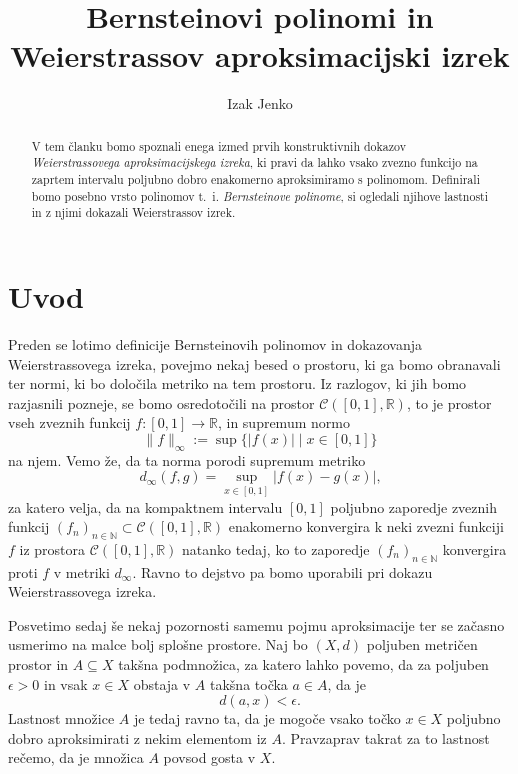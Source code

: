 \documentclass[a4paper, reqno]{amsart}
\theoremstyle{theorem}
\theoremstyle{definition}
\begin{document}
\title{Bernsteinovi polinomi in Weierstrassov aproksimacijski izrek}
\author{Izak Jenko}

\maketitle
\thispagestyle{empty}

\begin{abstract}
	V tem članku bomo spoznali enega izmed prvih konstruktivnih dokazov 
	\emph{Weierstrassovega aproksimacijskega izreka}, ki pravi da lahko vsako zvezno 
	funkcijo na zaprtem intervalu poljubno dobro enakomerno aproksimiramo s polinomom. 
	Definirali bomo posebno vrsto polinomov t.~i. \emph{Bernsteinove polinome}, si ogledali
	njihove lastnosti in z njimi dokazali Weierstrassov izrek.
\end{abstract}

\newcommand{\RR}{\mathbb{R}}
\newcommand{\NN}{\mathbb{N}}
\newcommand{\CIR}{\mathcal{C}([0,1],\RR)}
\newcommand{\dinf}{d_{\infty}}

\section{Uvod}

\par
Preden se lotimo definicije Bernsteinovih polinomov in dokazovanja Weierstrassovega
izreka, povejmo nekaj besed o prostoru, ki ga bomo obranavali ter normi, ki bo
določila metriko na tem prostoru. Iz razlogov, ki jih bomo razjasnili pozneje, se bomo
osredotočili na prostor $\mathcal{C}([0,1],\mathbb{R})$, to je prostor vseh zveznih
funkcij $f: [0,1] \to \RR$, in supremum normo
$$\|f\|_{\infty} := \sup \{|f(x)|\mid x \in [0,1]\}$$
na njem. Vemo že, da ta norma porodi supremum metriko
$$\dinf (f, g) = 
\sup_{x \in [0,1]} |f(x) - g(x)| \text{,}$$
za katero velja, da na kompaktnem intervalu $[0,1]$ poljubno zaporedje zveznih funkcij 
$(f_n)_{n \in \NN} \subset \CIR$ enakomerno konvergira k neki zvezni funkciji 
$f$ iz prostora $\CIR$
natanko tedaj, ko to zaporedje $(f_n)_{n \in \NN}$ konvergira proti $f$ v metriki $\dinf$.
Ravno to dejstvo pa bomo uporabili pri dokazu Weierstrassovega izreka. 
\par
Posvetimo sedaj še nekaj pozornosti samemu pojmu aproksimacije ter se začasno usmerimo
na malce bolj splošne prostore. Naj bo $(X, d)$ poljuben metričen prostor in $A \subseteq X$
takšna podmnožica, za katero lahko povemo, da za poljuben $\epsilon > 0$ in vsak $x \in X$ 
obstaja v $A$ takšna točka $a \in A$, da je $$d(a, x) < \epsilon\text{.}$$ Lastnost množice
$A$ je tedaj ravno ta, da je mogoče vsako točko $x \in X$ poljubno dobro aproksimirati
z nekim elementom iz $A$. Pravzaprav takrat za to lastnost rečemo, da je množica $A$
povsod gosta v $X$. 
\end{document}
